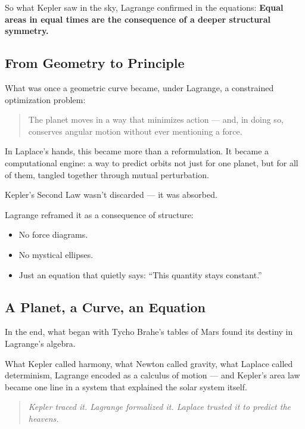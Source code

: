 So what Kepler saw in the sky, Lagrange confirmed in the equations:  
\textbf{Equal areas in equal times are the consequence of a deeper structural symmetry.}

\subsection{From Geometry to Principle}

What was once a geometric curve became, under Lagrange, a constrained optimization problem:
\begin{quote}
    The planet moves in a way that minimizes action —  
    and, in doing so, conserves angular motion without ever mentioning a force.
\end{quote}

In Laplace’s hands, this became more than a reformulation. It became a computational engine:  
a way to predict orbits not just for one planet, but for all of them, tangled together through mutual perturbation.

\begin{tcolorbox}[colback=blue!5!white, colframe=blue!60!black, title={Kepler, Rediscovered}]
Kepler’s Second Law wasn’t discarded — it was absorbed.

Lagrange reframed it as a consequence of structure:  
\begin{itemize}
    \item No force diagrams.
    \item No mystical ellipses.
    \item Just an equation that quietly says: “This quantity stays constant.”
\end{itemize}
\end{tcolorbox}

\subsection{A Planet, a Curve, an Equation}

In the end, what began with Tycho Brahe’s tables of Mars found its destiny in Lagrange’s algebra.

What Kepler called harmony,  
what Newton called gravity,  
what Laplace called determinism,  
Lagrange encoded as a calculus of motion — and Kepler’s area law became one line in a system that explained the solar system itself.

\begin{quote}
    \textit{Kepler traced it.  
    Lagrange formalized it.  
    Laplace trusted it to predict the heavens.}
\end{quote}
